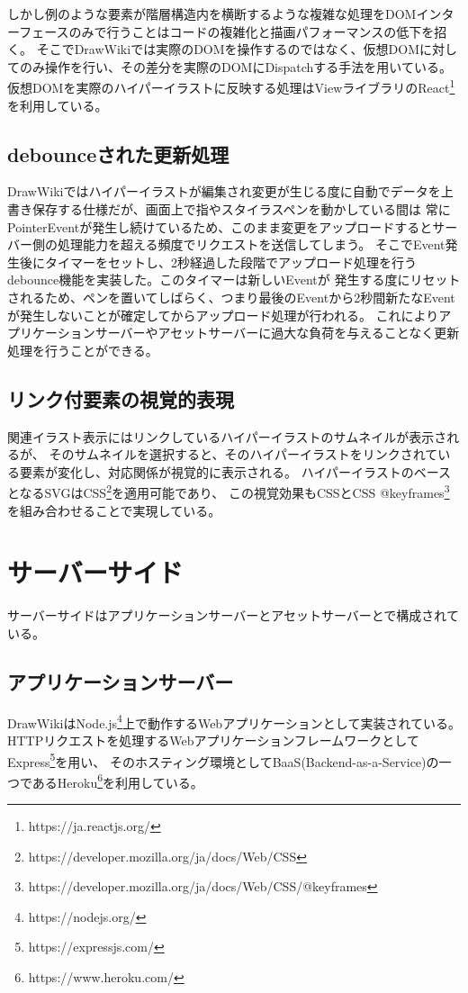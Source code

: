 しかし例のような要素が階層構造内を横断するような複雑な処理をDOMインターフェースのみで行うことはコードの複雑化と描画パフォーマンスの低下を招く。
そこでDrawWikiでは実際のDOMを操作するのではなく、仮想DOMに対してのみ操作を行い、その差分を実際のDOMにDispatchする手法を用いている。
仮想DOMを実際のハイパーイラストに反映する処理はViewライブラリのReact\footnote{https://ja.reactjs.org/}を利用している。

\subsection{debounceされた更新処理}
DrawWikiではハイパーイラストが編集され変更が生じる度に自動でデータを上書き保存する仕様だが、画面上で指やスタイラスペンを動かしている間は
常にPointerEventが発生し続けているため、このまま変更をアップロードするとサーバー側の処理能力を超える頻度でリクエストを送信してしまう。
そこでEvent発生後にタイマーをセットし、2秒経過した段階でアップロード処理を行うdebounce機能を実装した。このタイマーは新しいEventが
発生する度にリセットされるため、ペンを置いてしばらく、つまり最後のEventから2秒間新たなEventが発生しないことが確定してからアップロード処理が行われる。
これによりアプリケーションサーバーやアセットサーバーに過大な負荷を与えることなく更新処理を行うことができる。


\subsection{リンク付要素の視覚的表現}
関連イラスト表示にはリンクしているハイパーイラストのサムネイルが表示されるが、
そのサムネイルを選択すると、そのハイパーイラストをリンクされている要素が変化し、対応関係が視覚的に表示される。
ハイパーイラストのベースとなるSVGはCSS\footnote{https://developer.mozilla.org/ja/docs/Web/CSS}を適用可能であり、
この視覚効果もCSSとCSS @keyframes\footnote{https://developer.mozilla.org/ja/docs/Web/CSS/@keyframes}を組み合わせることで実現している。

\section{サーバーサイド}
サーバーサイドはアプリケーションサーバーとアセットサーバーとで構成されている。

\subsection{アプリケーションサーバー}
DrawWikiはNode.js\footnote{https://nodejs.org/}上で動作するWebアプリケーションとして実装されている。
HTTPリクエストを処理するWebアプリケーションフレームワークとしてExpress\footnote{https://expressjs.com/}を用い、
そのホスティング環境としてBaaS(Backend-as-a-Service)の一つであるHeroku\footnote{https://www.heroku.com/}を利用している。

